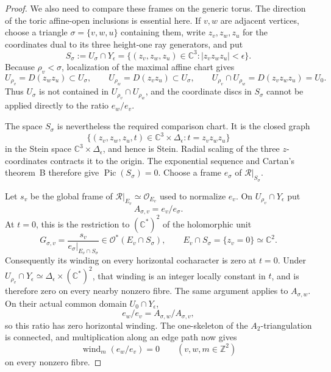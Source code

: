 \begin{proof}
We also need to compare these frames on the generic torus.  The direction
of the toric affine-open inclusions is essential here.  If \(v,w\) are
adjacent vertices, choose a triangle \(\sigma=\{v,w,u\}\) containing them,
write \(z_v,z_w,z_u\) for the coordinates dual to its three height-one ray
generators, and put
\[
 S_\sigma:=U_\sigma\cap Y_\epsilon
 =\{(z_v,z_w,z_u)\in\mathbb C^3:
       |z_vz_wz_u|<\epsilon\}.
\tag{5.17-A34a}
\]
Because \(\rho_v<\sigma\), localization of the maximal affine chart gives
\begin{equation}
 U_{\rho_v}=D(z_wz_u)\subset U_\sigma,\qquad
 U_{\rho_w}=D(z_vz_u)\subset U_\sigma,\qquad
 U_{\rho_v}\cap U_{\rho_w}=D(z_vz_wz_u)=U_0.
\label{eq:analytic-toric-open-directions}
\end{equation}
Thus \(U_\sigma\) is not contained in \(U_{\rho_v}\cap U_{\rho_w}\), and
the coordinate discs in \(S_\sigma\) cannot be applied directly to the
ratio \(e_w/e_v\).

The space \(S_\sigma\) is nevertheless the required comparison chart.  It
is the closed graph
\[
 \{(z_v,z_w,z_u,t)\in\mathbb C^3\times\Delta_\epsilon:
   t=z_vz_wz_u\}
\]
in the Stein space \(\mathbb C^3\times\Delta_\epsilon\), and hence is
Stein.  Radial scaling of the three \(z\)-coordinates contracts it to the
origin.  The exponential sequence and Cartan's theorem~B therefore give
\(\operatorname{Pic}(S_\sigma)=0\).  Choose a frame \(e_\sigma\) of
\(\mathcal R|_{S_\sigma}\).

Let \(s_v\) be the global frame of
\(\mathcal R|_{E_v}\simeq\mathcal O_{E_v}\) used to normalize \(e_v\).
On \(U_{\rho_v}\cap Y_\epsilon\) put
\[
 A_{\sigma,v}=e_v/e_\sigma.
\]
At \(t=0\), this is the restriction to \((\mathbb C^*)^2\) of the
holomorphic unit
\[
 G_{\sigma,v}
 =\frac{s_v}{e_\sigma|_{E_v\cap S_\sigma}}
 \in\mathcal O^*(E_v\cap S_\sigma),
 \qquad E_v\cap S_\sigma=\{z_v=0\}\simeq\mathbb C^2.
\]
Consequently its winding on every horizontal cocharacter is zero at
\(t=0\).  Under
\(U_{\rho_v}\cap Y_\epsilon\simeq
\Delta_\epsilon\times(\mathbb C^*)^2\), that winding is an integer locally
constant in \(t\), and is therefore zero on every nearby nonzero fibre.
The same argument applies to \(A_{\sigma,w}\).  On their actual common
domain \(U_0\cap Y_\epsilon\),
\[
 e_w/e_v=A_{\sigma,w}/A_{\sigma,v},
\]
so this ratio has zero horizontal winding.  The one-skeleton of the
\(A_2\)-triangulation is connected, and multiplication along an edge path
now gives
\[
 \operatorname{wind}_m(e_w/e_v)=0
 \qquad(v,w,m\in\mathbb Z^2)
\tag{5.17-A34b}
\]
on every nonzero fibre.


\end{proof}
